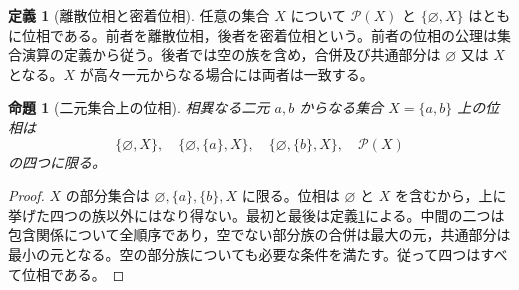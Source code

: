 \documentclass[a5paper,10pt,dvipdfmx]{jsarticle}
\theoremstyle{definition}
\newtheorem{defn}[ruledef]{定義}
\theoremstyle{plain}
\newtheorem{prop}[ruledef]{命題}
\newcommand{\Pow}{\mathcal{P}}
\begin{document}
\begin{defn}[離散位相と密着位相]\label{k150}
任意の集合 $X$ について $\Pow(X)$ と $\{\varnothing,X\}$ はともに位相である。前者を離散位相，後者を密着位相という。前者の位相の公理は集合演算の定義から従う。後者では空の族を含め，合併及び共通部分は $\varnothing$ 又は $X$ となる。$X$ が高々一元からなる場合には両者は一致する。
\end{defn}
\begin{prop}[二元集合上の位相]\label{k151}
相異なる二元 $a,b$ からなる集合 $X=\{a,b\}$ 上の位相は
\[\{\varnothing,X\},\quad \{\varnothing,\{a\},X\},\quad
\{\varnothing,\{b\},X\},\quad \Pow(X)\]
の四つに限る。
\end{prop}
\begin{proof}
$X$ の部分集合は $\varnothing,\{a\},\{b\},X$ に限る。位相は $\varnothing$ と $X$ を含むから，上に挙げた四つの族以外にはなり得ない。最初と最後は定義\ref{k150}による。中間の二つは包含関係について全順序であり，空でない部分族の合併は最大の元，共通部分は最小の元となる。空の部分族についても必要な条件を満たす。従って四つはすべて位相である。
\end{proof}
\end{document}
